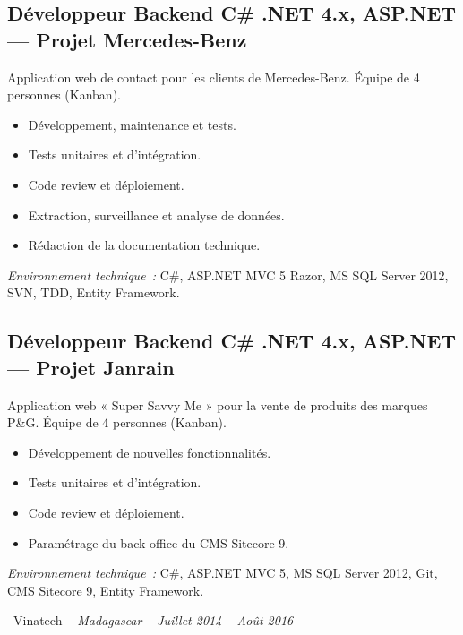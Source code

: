 \documentclass[10pt,a4paper]{article}
\begin{document}
\vspace{6pt}

\subsection*{Développeur Backend C\# .NET 4.x, ASP.NET --- Projet Mercedes-Benz}
\color{darkgray}
Application web de contact pour les clients de Mercedes-Benz. Équipe de 4 personnes (Kanban).
\begin{itemize}
  \item Développement, maintenance et tests.
  \item Tests unitaires et d'intégration.
  \item Code review et déploiement.
  \item Extraction, surveillance et analyse de données.
  \item Rédaction de la documentation technique.
\end{itemize}
\textit{Environnement technique~:} C\#, ASP.NET MVC 5 Razor, MS SQL Server 2012, SVN, TDD, Entity Framework.

\vspace{6pt}

\subsection*{Développeur Backend C\# .NET 4.x, ASP.NET --- Projet Janrain}
\color{darkgray}
Application web « Super Savvy Me » pour la vente de produits des marques P\&G. Équipe de 4 personnes (Kanban).
\begin{itemize}
  \item Développement de nouvelles fonctionnalités.
  \item Tests unitaires et d'intégration.
  \item Code review et déploiement.
  \item Paramétrage du back-office du CMS Sitecore 9.
\end{itemize}
\textit{Environnement technique~:} C\#, ASP.NET MVC 5, MS SQL Server 2012, Git, CMS Sitecore 9, Entity Framework.

\vspace{10pt}


\noindent\textcolor{primary}{ \faBuilding\ Vinatech} \quad
\textit{ \small \textcolor{darkgray}{ \faMapMarker\ } Madagascar } \hfill
\textit{ \small \textcolor{darkgray}{ \faCalendar\ } Juillet 2014 -- Août 2016 }

\vspace{4pt}
\end{document}
